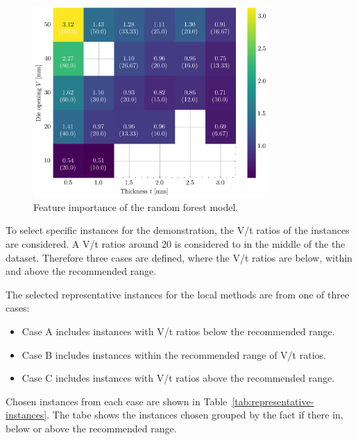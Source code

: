 \begin{figure}[h]
    \begin{tcolorbox}[arc=0pt,boxrule=0.5pt]
        \centering
        \includegraphics[width=0.8\textwidth]{chap5/images/mean_springback_heatmap}
    \end{tcolorbox}
    \caption{Feature importance of the random forest model.}
    \label{fig:springback-heatmap}
\end{figure}

To select specific instances for the demonstration, the V/t ratios of the instances are considered.
A V/t ratios around 20 is considered to in the middle of the the dataset.
Therefore three cases are defined, where the V/t ratios are below, within and above the recommended range.

The selected representative instances for the local methods are from one of three cases:
\begin{itemize}
    \item Case A includes instances with V/t ratios below the recommended range.
    \item Case B includes instances within the recommended range of V/t ratios.
    \item Case C includes instances with V/t ratios above the recommended range.
\end{itemize}

Chosen instances from each case are shown in Table~\ref{tab:representative-instances}.
The tabe shows the instances chosen grouped by the fact if there in, below or above the recommended range.

